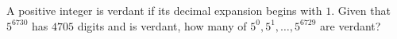A positive integer is verdant if its decimal expansion begins with $1$. Given that $5^{6730}$ has $4705$ digits and is verdant, how many of $5^0,5^1,\ldots,5^{6729}$ are verdant?

